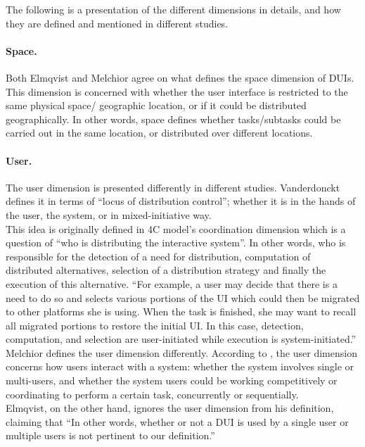 The following is a presentation of the different dimensions in details, and
how they are defined and mentioned in different studies.
\paragraph{Space.}  Both Elmqvist \cite{elmqvist2011distributed} and Melchior
\cite{melchior2011distributed} agree on what defines the space  dimension of
DUIs. This dimension is concerned with whether the user interface is
restricted to the same physical space/ geographic location, or if it could be
distributed geographically. In other words, space defines whether tasks/subtasks
could be carried out in the same location, or distributed over different
locations. 

\paragraph{User.} The user dimension is presented differently in different
studies. Vanderdonckt \cite{vanderdonckt2010distributed} defines it in terms of 
``locus of distribution control''; whether it is in the hands of the user, the
system, or in mixed-initiative way.\\
This idea is originally defined in 4C model's coordination dimension which is a
question of ``who is distributing the interactive system''\cite{demeure20084c}.
In other words, who is responsible for the detection of a need for distribution,
computation of distributed alternatives, selection of a distribution strategy and
finally the execution of this alternative. ``For example, a user may decide
that there is a need to do so and selects various portions of the UI which could
then be migrated to other platforms she is using. When the task is finished, she
may want to recall all migrated portions to restore the initial UI. In this
case, detection, computation, and selection are user-initiated while execution
is system-initiated.'' \cite{demeure20084c}\\
Melchior defines the user dimension differently. According to
\cite{melchior2011distributed}, the user dimension concerns how users interact
with a system: whether the system involves single or multi-users, and whether
the system users could be working competitively or coordinating to perform a
certain task, concurrently or sequentially.\\
Elmqvist, on the other hand, ignores the user dimension from his definition,
claiming that ``In other words, whether or not a DUI is used by a single user or multiple users is not pertinent to our
definition.''\cite{elmqvist2011distributed}

